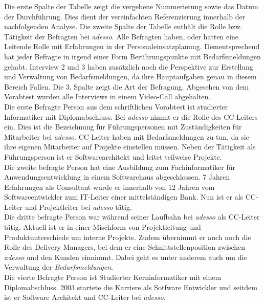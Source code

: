 Die erste Spalte der Tabelle zeigt die vergebene Nummerierung sowie das Datum der Durchführung. Dies dient der vereinfachten Referenzierung innerhalb der nachfolgenden Analyse. Die zweite Spalte der Tabelle enthält die Rolle bzw. Tätigkeit der Befragten bei \emph{adesso}. Alle Befragten haben, oder hatten eine Leitende Rolle mit Erfahrungen in der Personaleinsatzplanung. Dementsprechend hat jeder Befragte in irgend einer Form Berührungspunkte mit Bedarfsmeldungen gehabt. Interview 2 und 3 haben zusätzlich noch die Perspektive zur Erstellung und Verwaltung von Bedarfsmeldungen, da ihre Hauptaufgaben genau in diesem Bereich Fallen. Die 3. Spalte zeigt die Art der Befragung. Abgesehen von dem Vorabtest wurden alle Interviews in einem Video-Call abgehalten.\\

Die erste Befragte Person aus dem schriftlichen Vorabtest ist studierter Informatiker mit Diplomabschluss. Bei \emph{adesso} nimmt er die Rolle des CC-Leiters ein. Dies ist die Bezeichnung für Führungspersonen mit Zuständigkeiten für Mitarbeiter bei \emph{adesso}. CC-Leiter haben mit Bedarfsmeldungen zu tun, da sie ihre eigenen Mitarbeiter auf Projekte einstellen müssen. Neben der Tätigkeit als Führungsperson ist er Softwarearchitekt und leitet teilweise Projekte.\\

Die zweite befragte Person hat eine Ausbildung zum Fachinformatiker für Anwendungsentwicklung in einem Softwarehaus abgeschlossen. 7 Jahren Erfahrungen als Consultant wurde er innerhalb von 12 Jahren vom Softwareentwickler zum IT-Leiter einer mittelständigen Bank. Nun ist er als CC-Leiter und Projektleiter bei \emph{adesso} tätig.\\

Die dritte befragte Person war während seiner Laufbahn bei \emph{adesso} als CC-Leiter tätig. Aktuell ist er in einer Mischform von Projektleitung und Produktunterschiede um interne Projekte. Zudem übernimmt er auch noch die Rolle des Delivery Managers, bei dem er eine Schnittstellenposition zwischen \emph{adesso} und den Kunden einnimmt. Dabei geht es unter anderem auch um die Verwaltung der \emph{Bedarfsmeldungen}.\\

Die vierte Befragte Person ist Studierter Kerninformatiker mit einem Diplomabschluss. 2003 startete die Karriere als Sotfware Entwickler und seitdem ist er Software Architekt und CC-Leiter bei \emph{adesso}.\\

